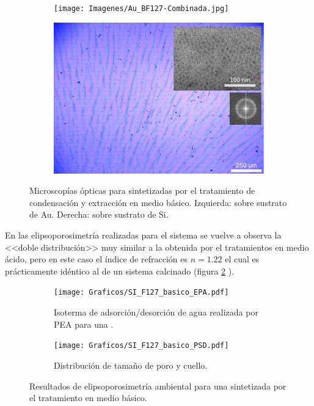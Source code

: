 {		\begin{figure}[!th]
 	   	    \begin{subfigure}[t]{0.49\textwidth}
	       	\texttt{[image: Imagenes/Au\_BF127-Combinada.jpg]}
	   		\end{subfigure}
	   		\begin{subfigure}[t]{0.49\textwidth}
	   	    \includegraphics[width=\textwidth]{Imagenes/Si_BF127-Combinada.jpg}
	   		\end{subfigure}
			 \caption[Microscopía óptica \pdmF tratamiento en medio básico.]{Microscopías ópticas para \pdmF\space sintetizadas por el tratamiento de condensación y extracción en medio básico. Izquierda: sobre sustrato de Au. Derecha: sobre sustrato de Si.}
			 \label{fig:Microscopia_F127_basico}	
		     \end{figure}	
		
		En las elipsoporosimetría realizadas para el sistema \pdmF\space se vuelve a observa la <<doble distribución>> muy similar a la obtenida por el tratamientos en medio ácido, pero en este caso el índice de refracción es $n=1.22$ el cual es prácticamente idéntico al de un sistema calcinado (figura \ref{fig:F127_basico_EPA} ).

		\begin{figure}[!ht]
		  	\begin{subfigure}[t]{0.495\textwidth}
		  	\texttt{[image: Graficos/SI\_F127\_basico\_EPA.pdf]}
			\caption[Elipsoporsimetría \pdmF\space tratamiento básico.]{Isoterma de adsorción/desorción de agua realizada por PEA para una \pdmF.}
			\label{fig:F127_basico_EPA}
			\end{subfigure}
			\begin{subfigure}[t]{0.495\textwidth}
		  	\texttt{[image: Graficos/SI\_F127\_basico\_PSD.pdf]}
			\caption{Distribución de tamaño de poro y cuello.\\ }
			\label{fig:F127_basico_PSD}
			\end{subfigure}
			\caption[Elipsoporosimetría \pdmF\space tratamiento básico.]{Resultados de elipsoporosimetría ambiental para una \pdmF\space sintetizada por el tratamiento en medio básico.}
			\end{figure}

}
